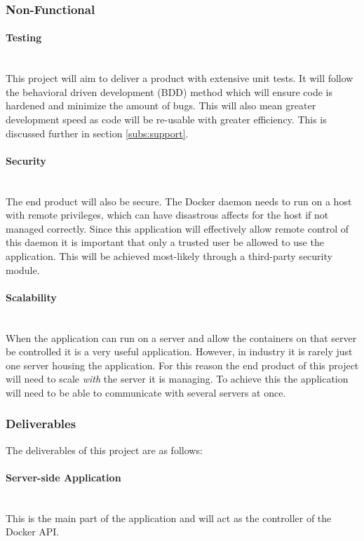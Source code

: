 \documentclass{article}
\begin{document}
\subsubsection{Non-Functional}

\paragraph{Testing}\mbox{}\\
This project will aim to deliver a product with extensive unit tests. It will follow the behavioral driven development (BDD) method which will ensure code is hardened and minimize the amount of bugs. This will also mean greater development speed as code will be re-usable with greater efficiency. This is discussed further in section \ref{subs:support}.

\paragraph{Security}\mbox{}\\%
The end product will also be secure. The Docker daemon needs to run on a host with remote privileges, which can have disastrous affects for the host if not managed correctly. Since this application will effectively allow remote control of this daemon it is important that only a trusted user be allowed to use the application. This will be achieved most-likely through a third-party security module. 

\paragraph{Scalability}\mbox{}\\
When the application can run on a server and allow the containers on that server be controlled it is a very useful application. However, in industry it is rarely just one server housing the application. For this reason the end product of this project will need to scale \textit{with} the server it is managing. To achieve this the application will need to be able to communicate with several servers at once.

\subsubsection{Deliverables}
The deliverables of this project are as follows:

\paragraph{Server-side Application}\mbox{}\\
This is the main part of the application and will act as the controller of the Docker API.
\end{document}
